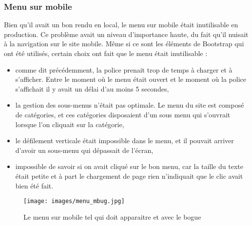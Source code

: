 \documentclass[12pt,a4paper]{article}
\begin{document}
\newpage
\subsubsection{Menu sur mobile}
Bien qu'il avait un bon rendu en local, le menu sur mobile était inutilisable en production. Ce problème avait un niveau d'importance haute, du fait qu'il nuisait à la navigation sur le site mobile. Même si ce sont les éléments de Bootstrap qui ont été utilisés, certain choix ont fait que le menu était inutilisable : 
\begin{itemize}
\item comme dit précédemment, la police prenait trop de temps à charger et à s'afficher. Entre le moment où le menu était ouvert et le moment où la police s'affichait il y avait un délai d'au moins 5 secondes,
\item la gestion des sous-menus n'était pas optimale. Le menu du site est composé de catégories, et ces catégories disposaient d'un sous menu qui s'ouvrait lorsque l'on cliquait sur la catégorie,
\item le défilement verticale était impossible dans le menu, et il pouvait arriver d'avoir un sous-menu qui dépassait de l'écran,
\item impossible de savoir si on avait cliqué sur le bon menu, car la taille du texte était petite et à part le chargement de page rien n'indiquait que le clic avait bien été fait.
\end{itemize}\par 

\begin{figure}[h!]
\centering\texttt{[image: images/menu\_mbug.jpg]} 
\caption{Le menu sur mobile tel qui doit apparaitre et avec le bogue}
\end{figure}
\end{document}
